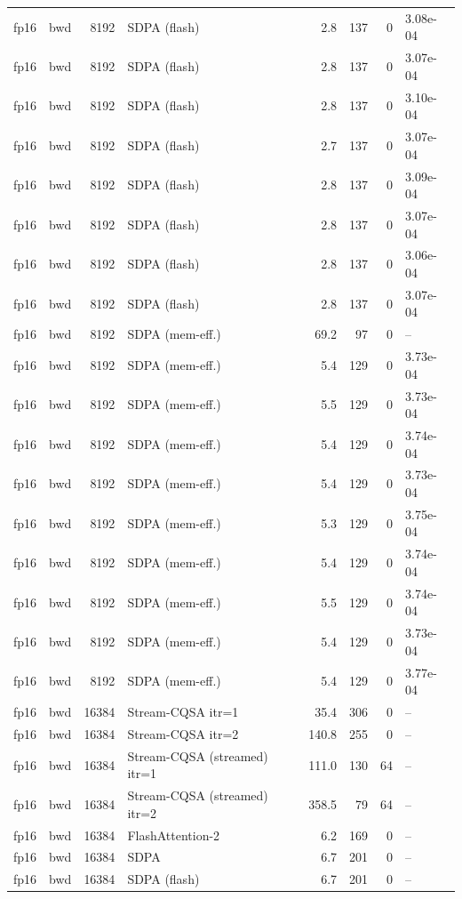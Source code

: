 \begin{tabular}{llrlrrrl}
fp16 & bwd & 8192 & SDPA (flash) & 2.8 & 137 & 0 & 3.08e-04 \\
fp16 & bwd & 8192 & SDPA (flash) & 2.8 & 137 & 0 & 3.07e-04 \\
fp16 & bwd & 8192 & SDPA (flash) & 2.8 & 137 & 0 & 3.10e-04 \\
fp16 & bwd & 8192 & SDPA (flash) & 2.7 & 137 & 0 & 3.07e-04 \\
fp16 & bwd & 8192 & SDPA (flash) & 2.8 & 137 & 0 & 3.09e-04 \\
fp16 & bwd & 8192 & SDPA (flash) & 2.8 & 137 & 0 & 3.07e-04 \\
fp16 & bwd & 8192 & SDPA (flash) & 2.8 & 137 & 0 & 3.06e-04 \\
fp16 & bwd & 8192 & SDPA (flash) & 2.8 & 137 & 0 & 3.07e-04 \\
fp16 & bwd & 8192 & SDPA (mem-eff.) & 69.2 & 97 & 0 & -- \\
fp16 & bwd & 8192 & SDPA (mem-eff.) & 5.4 & 129 & 0 & 3.73e-04 \\
fp16 & bwd & 8192 & SDPA (mem-eff.) & 5.5 & 129 & 0 & 3.73e-04 \\
fp16 & bwd & 8192 & SDPA (mem-eff.) & 5.4 & 129 & 0 & 3.74e-04 \\
fp16 & bwd & 8192 & SDPA (mem-eff.) & 5.4 & 129 & 0 & 3.73e-04 \\
fp16 & bwd & 8192 & SDPA (mem-eff.) & 5.3 & 129 & 0 & 3.75e-04 \\
fp16 & bwd & 8192 & SDPA (mem-eff.) & 5.4 & 129 & 0 & 3.74e-04 \\
fp16 & bwd & 8192 & SDPA (mem-eff.) & 5.5 & 129 & 0 & 3.74e-04 \\
fp16 & bwd & 8192 & SDPA (mem-eff.) & 5.4 & 129 & 0 & 3.73e-04 \\
fp16 & bwd & 8192 & SDPA (mem-eff.) & 5.4 & 129 & 0 & 3.77e-04 \\
fp16 & bwd & 16384 & Stream-CQSA itr=1 & 35.4 & 306 & 0 & -- \\
fp16 & bwd & 16384 & Stream-CQSA itr=2 & 140.8 & 255 & 0 & -- \\
fp16 & bwd & 16384 & Stream-CQSA (streamed) itr=1 & 111.0 & 130 & 64 & -- \\
fp16 & bwd & 16384 & Stream-CQSA (streamed) itr=2 & 358.5 & 79 & 64 & -- \\
fp16 & bwd & 16384 & FlashAttention-2 & 6.2 & 169 & 0 & -- \\
fp16 & bwd & 16384 & SDPA & 6.7 & 201 & 0 & -- \\
fp16 & bwd & 16384 & SDPA (flash) & 6.7 & 201 & 0 & -- \\

\end{tabular}
